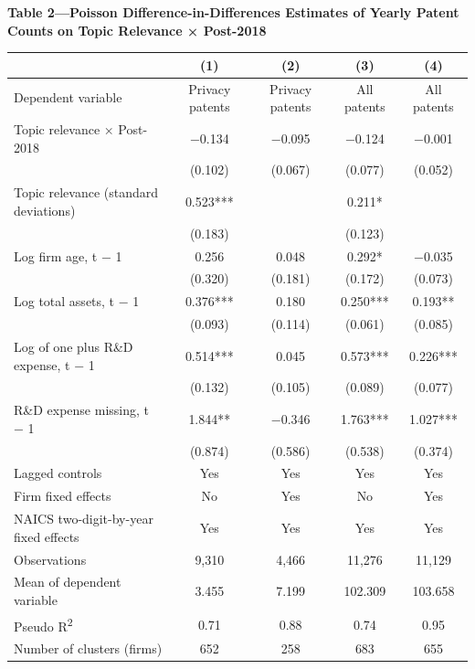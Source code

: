 \begin{table}[htbp]
\centering
\textbf{Table 2---Poisson Difference-in-Differences Estimates of Yearly Patent Counts on Topic Relevance × Post-2018}\par
\begin{tabular}{lcccc}
\toprule
 & (1) & (2) & (3) & (4) \\
\midrule
Dependent variable & Privacy patents & Privacy patents & All patents & All patents \\
Topic relevance × Post-2018 & −0.134 & −0.095 & −0.124 & −0.001 \\
 & (0.102) & (0.067) & (0.077) & (0.052) \\
Topic relevance (standard deviations) & 0.523*** &  & 0.211* &  \\
 & (0.183) &  & (0.123) &  \\
Log firm age, t − 1 & 0.256 & 0.048 & 0.292* & −0.035 \\
 & (0.320) & (0.181) & (0.172) & (0.073) \\
Log total assets, t − 1 & 0.376*** & 0.180 & 0.250*** & 0.193** \\
 & (0.093) & (0.114) & (0.061) & (0.085) \\
Log of one plus R\&D expense, t − 1 & 0.514*** & 0.045 & 0.573*** & 0.226*** \\
 & (0.132) & (0.105) & (0.089) & (0.077) \\
R\&D expense missing, t − 1 & 1.844** & −0.346 & 1.763*** & 1.027*** \\
 & (0.874) & (0.586) & (0.538) & (0.374) \\
\midrule
Lagged controls & Yes & Yes & Yes & Yes \\
Firm fixed effects & No & Yes & No & Yes \\
NAICS two-digit-by-year fixed effects & Yes & Yes & Yes & Yes \\
\midrule
Observations & 9,310 & 4,466 & 11,276 & 11,129 \\
Mean of dependent variable & 3.455 & 7.199 & 102.309 & 103.658 \\
Pseudo R\textsuperscript{2} & 0.71 & 0.88 & 0.74 & 0.95 \\
Number of clusters (firms) & 652 & 258 & 683 & 655 \\
\bottomrule
\end{tabular}

\end{table}
